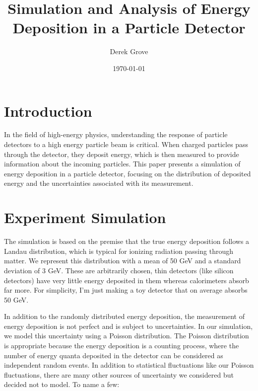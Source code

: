 \documentclass{article}
\title{Simulation and Analysis of Energy Deposition in a Particle Detector}
\author{Derek Grove}
\date{\today}
\begin{document}
\maketitle

\section*{Introduction}

In the field of high-energy physics, understanding the response of particle detectors to a high energy particle beam is critical. When charged particles pass through the detector, they deposit energy, which is then measured to provide information about the incoming particles. This paper presents a simulation of energy deposition in a particle detector, focusing on the distribution of deposited energy and the uncertainties associated with its measurement.

\section*{Experiment Simulation}

The simulation is based on the premise that the true energy deposition follows a Landau distribution, which is typical for ionizing radiation passing through matter. We represent this distribution with a mean of 50 GeV and a standard deviation of 3 GeV. These are arbitrarily chosen, thin detectors (like silicon detectors) have very little energy deposited in them whereas calorimeters absorb far more. For simplicity, I'm just making a toy detector that on average absorbs 50 GeV. 

In addition to the randomly distributed energy deposition, the measurement of energy deposition is not perfect and is subject to uncertainties. In our simulation, we model this uncertainty using a Poisson distribution. The Poisson distribution is appropriate because the energy deposition is a counting process, where the number of energy quanta deposited in the detector can be considered as independent random events. In addition to statistical fluctuations like our Poisson fluctuations, there are many other sources of uncertainty we considered but decided not to model. To name a few: 
\end{document}
